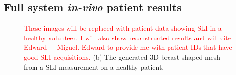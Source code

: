 \subsection{Full system \textit{in-vivo} patient results}
\begin{figure}
    \begin{center}
    \end{center}
    \caption{\textcolor{red}{These images will be replaced with patient data showing SLI in a healthy volunteer. I will also show reconstructed results and will cite Edward + Miguel. Edward to provide me with patient IDs that have good SLI acquisitions. } (b) The generated 3D breast-shaped mesh from a \ac{SLI} measurement on a healthy patient.} 
    \label{fig:PatientResults}
\end{figure} 

